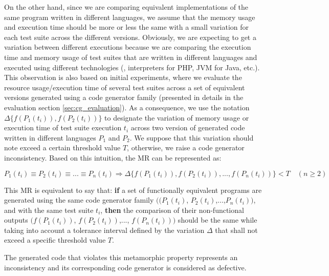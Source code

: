 On the other hand, since we are comparing equivalent implementations of the same program written in different languages, we assume that the memory usage and execution time should be more or less the same with a small variation for each test suite across the different versions. Obviously, we are expecting to get a variation between different executions because we are comparing the execution time and memory usage of test suites that are written in different languages and executed using different technologies (\eg, interpreters for PHP, JVM for Java, etc.). 
This observation is also based on initial experiments, where we evaluate the resource usage/execution time of several test suites across a set of equivalent versions generated using a code generator family (presented in details in the evaluation section \ref{sec:cg_evaluation}). As a consequence, we use the notation $\Delta\{f(P_{1}(t_{i})), f(P_{2}(t_{i}))\}$ to designate the variation of memory usage or execution time of test suite execution $t_{i}$ across two version of generated code written in different languages $P_{1}$ and $P_{2}$. We suppose that this variation should note exceed a certain threshold value $T$, otherwise, we raise a code generator inconsistency.
Based on this intuition, the MR can be represented as:

\begin{equation}
P_{1}(t_{i}) \equiv P_{2}(t_{i}) \equiv ... \equiv P_{n}(t_{i}) \Rightarrow \Delta\{f(P_{1}(t_{i})), f(P_{2}(t_{i})),..., f(P_{n}(t_{i}))\} < T\quad (n\geqslant 2)
\end{equation}

This MR is equivalent to say that: \textbf{if} a set of functionally equivalent programs are generated using the same code generator family $((P_{1}(t_{i})$, $P_{2}(t_{i})$,...,$P_{n}(t_{i}))$, and with the same test suite $t_{i}$, \textbf{then} the comparison of their non-functional outputs $(f(P_{1}(t_{i}))$, $f(P_{2}(t_{i}))$,..., $f(P_{n}(t_{i})))$ should be the same while taking into account a tolerance interval defined by the variation $\Delta$ that shall not exceed a specific threshold value $T$.

The generated code that violates this metamorphic property represents an inconsistency and its corresponding code generator is considered as defective.

 



